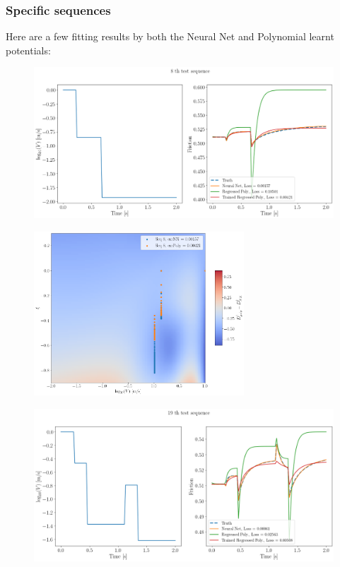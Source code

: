 \subsubsection{Specific sequences}
Here are a few fitting results by both the Neural Net and Polynomial learnt potentials:
\begin{figure}[H]
    \centering
    \includegraphics[width=1.0\textwidth]{images/polynomialRegressedTrainedSeq8.png}
\end{figure}
\begin{figure}[H]
    \centering
    \includegraphics[width=0.7\textwidth]{images/Trial0216_errDdagger_seq8.png}
\end{figure}
\begin{figure}[H]
    \centering
    \includegraphics[width=1.0\textwidth]{images/polynomialRegressedTrainedSeq19.png}
\end{figure}
